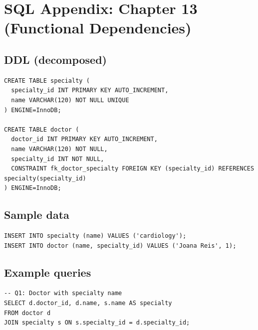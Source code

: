 \chapter{SQL Appendix: Chapter 13 (Functional Dependencies)}

\section{DDL (decomposed)}
\begin{verbatim}
CREATE TABLE specialty (
  specialty_id INT PRIMARY KEY AUTO_INCREMENT,
  name VARCHAR(120) NOT NULL UNIQUE
) ENGINE=InnoDB;

CREATE TABLE doctor (
  doctor_id INT PRIMARY KEY AUTO_INCREMENT,
  name VARCHAR(120) NOT NULL,
  specialty_id INT NOT NULL,
  CONSTRAINT fk_doctor_specialty FOREIGN KEY (specialty_id) REFERENCES specialty(specialty_id)
) ENGINE=InnoDB;
\end{verbatim}

\section{Sample data}
\begin{verbatim}
INSERT INTO specialty (name) VALUES ('cardiology');
INSERT INTO doctor (name, specialty_id) VALUES ('Joana Reis', 1);
\end{verbatim}

\section{Example queries}
\begin{verbatim}
-- Q1: Doctor with specialty name
SELECT d.doctor_id, d.name, s.name AS specialty
FROM doctor d
JOIN specialty s ON s.specialty_id = d.specialty_id;
\end{verbatim}
